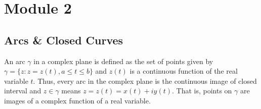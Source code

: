 

\section{Module 2}
\subsection{Arcs \& Closed Curves}
	An arc $\gamma$ in a complex plane is defined as the set of points given by $\gamma = \{ z : z = z(t), a \le t \le b \}$ and $z(t)$ is a continuous function of the real variable $t$. Thus, every arc in the complex plane is the continuous image of closed interval and $z \in \gamma$ means $z = z(t) = x(t) + iy(t)$. That is, points on $\gamma$ are images of a complex function of a real variable.

